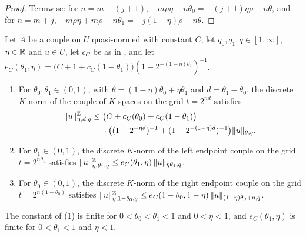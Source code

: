 \begin{proof}
\leanok
Termwise: for $n = m - (j + 1)$, $-m\rho\eta - n\theta_0 = -(j+1)\eta\rho - n\theta$, and for
$n = m + j$, $-m\rho\eta + m\rho - n\theta_1 = -j(1-\eta)\rho - n\theta$.
\end{proof}

\begin{proposition}
\label{prop:reiteration-bound}
\leanok
{}
Let $A$ be a couple on $U$ quasi-normed with constant $C$, let $q_0, q_1, q \in [1, \infty]$,
$\eta \in \mathbb{R}$ and $u \in U$, let $c_C$ be as in , and let
$e_C(\theta_1, \eta) = \bigl(C + 1 + c_C(1 - \theta_1)\bigr) (1 - 2^{-(1-\eta)\theta_1})^{-1}$.
\begin{enumerate}
  \item For $\theta_0, \theta_1 \in (0, 1)$, with $\theta = (1 - \eta)\theta_0 + \eta\theta_1$ and
    $d = \theta_1 - \theta_0$, the discrete $K$-norm of the couple of $K$-spaces on the grid
    $t = 2^{nd}$ satisfies
    \begin{align*}
      \|u\|^{\mathbb{Z}}_{\eta, d, q} \leq{} &\bigl(C + c_C(\theta_0) + c_C(1 - \theta_1)\bigr) \\
      &\cdot \bigl((1 - 2^{-\eta d})^{-1} + (1 - 2^{-(1-\eta) d})^{-1}\bigr)
      \|u\|_{\theta, q} .
    \end{align*}
  \item For $\theta_1 \in (0, 1)$, the discrete $K$-norm of the left endpoint couple on the grid
    $t = 2^{n\theta_1}$ satisfies $\|u\|^{\mathbb{Z}}_{\eta, \theta_1, q} \leq e_C(\theta_1, \eta) \,
    \|u\|_{\eta\theta_1, q}$.
  \item For $\theta_0 \in (0, 1)$, the discrete $K$-norm of the right endpoint couple on the
    grid $t = 2^{n(1-\theta_0)}$ satisfies $\|u\|^{\mathbb{Z}}_{\eta, 1 - \theta_0, q} \leq
    e_C(1 - \theta_0, 1 - \eta) \, \|u\|_{(1-\eta)\theta_0 + \eta, q}$.
\end{enumerate}
The constant of (1) is finite for $0 < \theta_0 < \theta_1 < 1$ and $0 < \eta < 1$, and
$e_C(\theta_1, \eta)$ is finite for $0 < \theta_1 < 1$ and $\eta < 1$.
\end{proposition}

